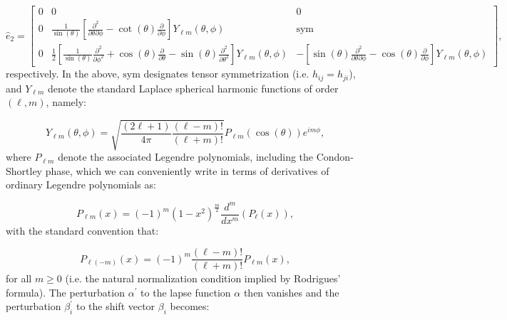 \documentclass{article}
\begin{document}
\begin{equation}
\hat{e}_2 = \begin{bmatrix}
0 & 0 & 0\\
0 & \frac{1}{\sin \left( \theta \right)} \left[ \frac{\partial^2}{\partial \theta \partial \phi} - \cot \left( \theta \right) \frac{\partial}{\partial \phi} \right] Y_{\ell m} \left( \theta, \phi \right) & \mathrm{sym}\\
0 & \frac{1}{2} \left[ \frac{1}{\sin \left( \theta \right)} \frac{\partial^2}{\partial \phi^2} + \cos \left( \theta \right) \frac{\partial}{\partial \theta} - \sin \left( \theta \right) \frac{\partial^2}{\partial \theta^2} \right] Y_{\ell m} \left( \theta, \phi \right) & - \left[ \sin \left( \theta \right) \frac{\partial^2}{\partial \theta \partial \phi} - \cos \left( \theta \right) \frac{\partial}{\partial \phi} \right] Y_{\ell m} \left( \theta, \phi \right)
\end{bmatrix},
\end{equation}
respectively. In the above, ${\mathrm{sym}}$ designates tensor symmetrization (i.e. ${h_{i j} = h_{j i}}$), and ${Y_{\ell m}}$ denote the standard Laplace spherical harmonic functions\cite{courant} of order ${\left( \ell, m \right)}$, namely:

\begin{equation}
Y_{\ell m} \left( \theta, \phi \right) = \sqrt{\frac{\left( 2 \ell + 1 \right)}{4 \pi} \frac{\left( \ell - m \right)!}{\left( \ell + m \right)!}} P_{\ell m} \left( \cos \left( \theta \right) \right) e^{i m \phi},
\end{equation}
where ${P_{\ell m}}$ denote the associated Legendre polynomials, including the Condon-Shortley phase\cite{condon}, which we can conveniently write in terms of derivatives of ordinary Legendre polynomials as:

\begin{equation}
P_{\ell m} \left( x \right) = \left( -1 \right)^m \left( 1 - x^2 \right)^{\frac{m}{2}} \frac{d^m}{d x^m} \left( P_{\ell} \left( x \right) \right),
\end{equation}
with the standard convention that:

\begin{equation}
P_{\ell \left( -m \right)} \left( x \right) = \left( -1 \right)^{m} \frac{\left( \ell - m \right)!}{\left( \ell + m \right)!} P_{\ell m} \left( x \right),
\end{equation}
for all ${m \geq 0}$ (i.e. the natural normalization condition implied by Rodrigues' formula). The perturbation ${\alpha^{\prime}}$ to the lapse function ${\alpha}$ then vanishes and the perturbation ${\beta_{i}^{\prime}}$ to the shift vector ${\beta_i}$ becomes:
\end{document}
